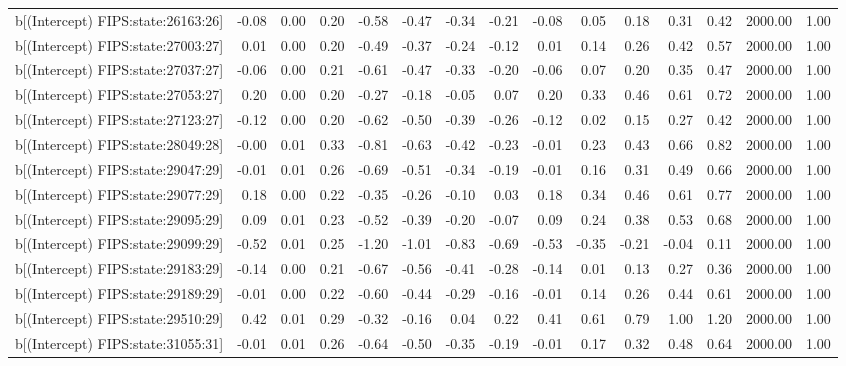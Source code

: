 \begin{table}[ht]
\begin{tabular}{rrrrrrrrrrrrrrr}
  b[(Intercept) FIPS:state:26163:26] & -0.08 & 0.00 & 0.20 & -0.58 & -0.47 & -0.34 & -0.21 & -0.08 & 0.05 & 0.18 & 0.31 & 0.42 & 2000.00 & 1.00 \\ 
  b[(Intercept) FIPS:state:27003:27] & 0.01 & 0.00 & 0.20 & -0.49 & -0.37 & -0.24 & -0.12 & 0.01 & 0.14 & 0.26 & 0.42 & 0.57 & 2000.00 & 1.00 \\ 
  b[(Intercept) FIPS:state:27037:27] & -0.06 & 0.00 & 0.21 & -0.61 & -0.47 & -0.33 & -0.20 & -0.06 & 0.07 & 0.20 & 0.35 & 0.47 & 2000.00 & 1.00 \\ 
  b[(Intercept) FIPS:state:27053:27] & 0.20 & 0.00 & 0.20 & -0.27 & -0.18 & -0.05 & 0.07 & 0.20 & 0.33 & 0.46 & 0.61 & 0.72 & 2000.00 & 1.00 \\ 
  b[(Intercept) FIPS:state:27123:27] & -0.12 & 0.00 & 0.20 & -0.62 & -0.50 & -0.39 & -0.26 & -0.12 & 0.02 & 0.15 & 0.27 & 0.42 & 2000.00 & 1.00 \\ 
  b[(Intercept) FIPS:state:28049:28] & -0.00 & 0.01 & 0.33 & -0.81 & -0.63 & -0.42 & -0.23 & -0.01 & 0.23 & 0.43 & 0.66 & 0.82 & 2000.00 & 1.00 \\ 
  b[(Intercept) FIPS:state:29047:29] & -0.01 & 0.01 & 0.26 & -0.69 & -0.51 & -0.34 & -0.19 & -0.01 & 0.16 & 0.31 & 0.49 & 0.66 & 2000.00 & 1.00 \\ 
  b[(Intercept) FIPS:state:29077:29] & 0.18 & 0.00 & 0.22 & -0.35 & -0.26 & -0.10 & 0.03 & 0.18 & 0.34 & 0.46 & 0.61 & 0.77 & 2000.00 & 1.00 \\ 
  b[(Intercept) FIPS:state:29095:29] & 0.09 & 0.01 & 0.23 & -0.52 & -0.39 & -0.20 & -0.07 & 0.09 & 0.24 & 0.38 & 0.53 & 0.68 & 2000.00 & 1.00 \\ 
  b[(Intercept) FIPS:state:29099:29] & -0.52 & 0.01 & 0.25 & -1.20 & -1.01 & -0.83 & -0.69 & -0.53 & -0.35 & -0.21 & -0.04 & 0.11 & 2000.00 & 1.00 \\ 
  b[(Intercept) FIPS:state:29183:29] & -0.14 & 0.00 & 0.21 & -0.67 & -0.56 & -0.41 & -0.28 & -0.14 & 0.01 & 0.13 & 0.27 & 0.36 & 2000.00 & 1.00 \\ 
  b[(Intercept) FIPS:state:29189:29] & -0.01 & 0.00 & 0.22 & -0.60 & -0.44 & -0.29 & -0.16 & -0.01 & 0.14 & 0.26 & 0.44 & 0.61 & 2000.00 & 1.00 \\ 
  b[(Intercept) FIPS:state:29510:29] & 0.42 & 0.01 & 0.29 & -0.32 & -0.16 & 0.04 & 0.22 & 0.41 & 0.61 & 0.79 & 1.00 & 1.20 & 2000.00 & 1.00 \\ 
  b[(Intercept) FIPS:state:31055:31] & -0.01 & 0.01 & 0.26 & -0.64 & -0.50 & -0.35 & -0.19 & -0.01 & 0.17 & 0.32 & 0.48 & 0.64 & 2000.00 & 1.00 \\ 

\end{tabular}
\end{table}
